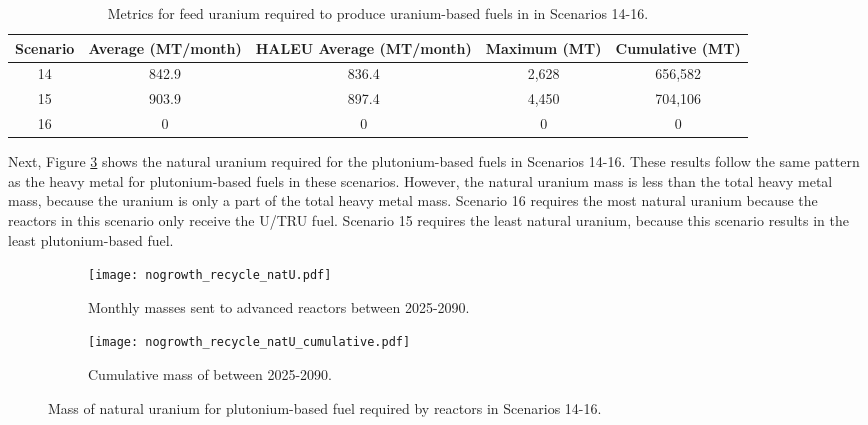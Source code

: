 \begin{table}[h!]
    \centering 
    \caption{Metrics for feed uranium required to produce 
    uranium-based fuels in in Scenarios 14-16.}
    \label{tab:s14-16_feed}
    \begin{tabular}{c c c c c}
        \hline 
        Scenario & Average (MT/month) & HALEU Average (MT/month) &
        Maximum (MT) & Cumulative (MT) \\
        \hline 
        14 & 842.9 & 836.4 & 2,628 & 656,582 \\
        15 & 903.9 & 897.4 & 4,450 & 704,106\\
        16 & 0 & 0 & 0 & 0\\
        \hline
        
    \end{tabular}
\end{table}

Next, Figure \ref{fig:nogrowth_recycle_natu} shows the natural 
uranium required for the plutonium-based fuels in Scenarios 14-16. 
These results follow the same pattern as the heavy metal for 
plutonium-based fuels in these scenarios. However, the natural 
uranium mass is less than the total heavy metal mass, because the 
uranium is only a part of the total heavy metal mass. Scenario 16 requires 
the most natural uranium because the reactors in this scenario 
only receive the U/TRU fuel. Scenario 15 requires the least 
natural uranium, because this scenario results in the least 
plutonium-based fuel.

\begin{figure}[h!]
    \centering
    \begin{subfigure}[b]{0.45\textwidth}
        \centering
        \texttt{[image: nogrowth\_recycle\_natU.pdf]}
        \caption{Monthly masses sent to 
        advanced reactors between 2025-2090.}
        \label{fig:nogrowth_recycle_AR_natu}
    \end{subfigure}
    \hfill
    \begin{subfigure}[b]{0.45\textwidth}
        \centering
        \texttt{[image: nogrowth\_recycle\_natU\_cumulative.pdf]}
        \caption{Cumulative mass of between 2025-2090.}
        \label{fig:nogrowth_recycle_natu_cumulative}
    \end{subfigure}
       \caption{Mass of natural uranium for plutonium-based fuel required 
       by reactors
        in Scenarios 14-16.}
       \label{fig:nogrowth_recycle_natu}
\end{figure}

